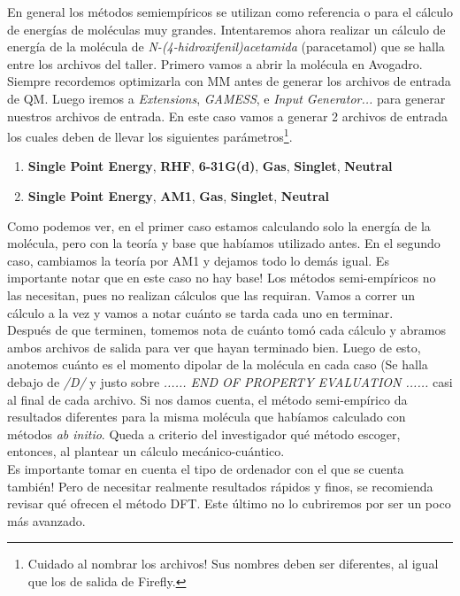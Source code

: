\documentclass[10pt,letterpaper]{article}
\begin{document}
En general los m\'etodos semiemp\'iricos se utilizan como referencia o para el c\'alculo de energ\'ias de mol\'eculas muy grandes. Intentaremos ahora realizar un c\'alculo de energ\'ia de la mol\'ecula de \emph{N-(4-hidroxifenil)acetamida} (paracetamol) que se halla entre los archivos del taller. Primero vamos a abrir la mol\'ecula en Avogadro. Siempre recordemos optimizarla con MM antes de generar los archivos de entrada de QM. Luego iremos a \textit{Extensions}, \textit{GAMESS}, e \textit{Input Generator...} para generar nuestros archivos de entrada. En este caso vamos a generar 2 archivos de entrada los cuales deben de llevar los siguientes par\'ametros\footnote{Cuidado al nombrar los archivos! Sus nombres deben ser diferentes, al igual que los de salida de Firefly.}.

\begin{enumerate}
\item \textbf{Single Point Energy}, \textbf{RHF}, \textbf{6-31G(d)}, \textbf{Gas}, \textbf{Singlet}, \textbf{Neutral}
\item \textbf{Single Point Energy}, \textbf{AM1}, \textbf{Gas}, \textbf{Singlet}, \textbf{Neutral}
\end{enumerate}

Como podemos ver, en el primer caso estamos calculando solo la energ\'ia de la mol\'ecula, pero con la teor\'ia y base que hab\'iamos utilizado antes. En el segundo caso, cambiamos la teor\'ia por AM1 y dejamos todo lo dem\'as igual. Es importante notar que en este caso no hay base! Los m\'etodos semi-emp\'iricos no las necesitan, pues no realizan c\'alculos que las requiran. Vamos a correr un c\'alculo a la vez y vamos a notar cu\'anto se tarda cada uno en terminar.\\

Despu\'es de que terminen, tomemos nota de cu\'anto tom\'o cada c\'alculo y abramos ambos archivos de salida para ver que hayan terminado bien. Luego de esto, anotemos cu\'anto es el momento dipolar de la mol\'ecula en cada caso (Se halla debajo de \textit{/D/} y justo sobre \textit{...... END OF PROPERTY EVALUATION ......} casi al final de cada archivo. Si nos damos cuenta, el m\'etodo semi-emp\'irico da resultados diferentes para la misma mol\'ecula que hab\'iamos calculado con m\'etodos \textit{ab initio}. Queda a criterio del investigador qu\'e m\'etodo escoger, entonces, al plantear un c\'alculo mec\'anico-cu\'antico.\\

Es importante tomar en cuenta el tipo de ordenador con el que se cuenta tambi\'en! Pero de necesitar realmente resultados r\'apidos y finos, se recomienda revisar qu\'e ofrecen el m\'etodo DFT. Este \'ultimo no lo cubriremos por ser un poco m\'as avanzado.\\
\end{document}
